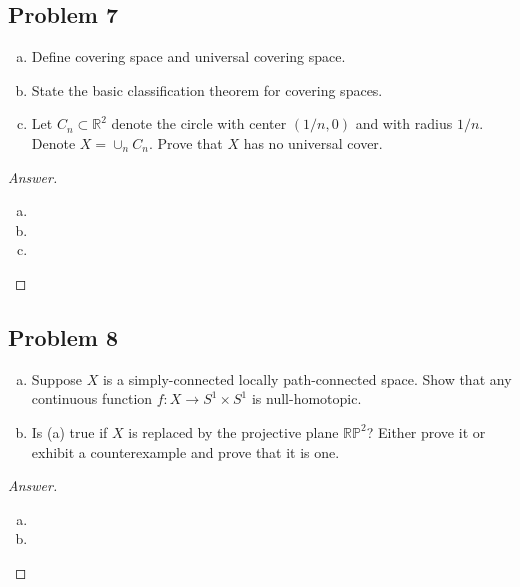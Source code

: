 \documentclass[12pt]{article}
\newcommand{\real}{\mathbb{R}}
\theoremstyle{definition}
\begin{document}
\subsection{Problem 7}
\begin{enumerate}[(a)]
    \item Define covering space and universal covering space.
    \item State the basic classification theorem for covering spaces.
    \item Let $C_n \subset \real^2$ denote the circle with center $(1/n,0)$ and with radius $1/n$. Denote $X = \cup_n C_n$. Prove that $X$ has no universal cover.
\end{enumerate}
\begin{proof}[Answer]
    \noindent
    \begin{enumerate}[(a)]
        \item 
        \item 
        \item 
    \end{enumerate}
\end{proof}
\subsection{Problem 8}
\begin{enumerate}[(a)]
    \item Suppose $X$ is a simply-connected locally path-connected space. Show that any continuous function $f : X \to S^1 \times S^1$ is null-homotopic.
    \item Is (a) true if $X$ is replaced by the projective plane $\mathbb{RP}^2$? Either prove it or exhibit a counterexample and prove that it is one.
\end{enumerate}
\begin{proof}[Answer]
    \noindent
    \begin{enumerate}[(a)]
        \item 
        \item 
    \end{enumerate}
\end{proof}
\end{document}
